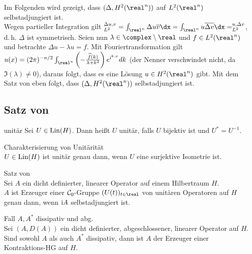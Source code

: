 \linie

\begin{Bsp}
    Im Folgenden wird gezeigt, dass $(\Delta, H^2(\real^n))$ auf $L^2(\real^n)$
    selbstadjungiert ist.\\
    Wegen partieller Integration gilt
    $\sp{\Delta u, v}_{L^2} = \int_{\real^n} \Delta u \overline{v} \dx
    = \int_{\real^n} u \overline{\Delta v} \dx = \sp{u, \Delta v}_{L^2}$,
    d.\,h. $\Delta$ ist symmetrisch.
    Seien nun $\lambda \in \complex \setminus \real$ und $f \in L^2(\real^n)$ und
    betrachte $\Delta u - \lambda u = f$.
    Mit Fouriertransformation gilt
    $u(x) = (2\pi)^{-n/2} \int_{\real^n}
    \left(-\frac{\widehat{f}(k)}{\lambda + k^2}\right) e^{\iu\sp{k, x}} dk$
    (der Nenner verschwindet nicht, da $\Im(\lambda) \not= 0$),
    daraus folgt, dass es eine Lösung $u \in H^2(\real^n)$ gibt.
    Mit dem Satz von eben folgt, dass $(\Delta, H^2(\real^n))$ selbstadjungiert ist.
\end{Bsp}

\pagebreak

\subsection{%
    Satz von %
}

\begin{Def}{unitär}
    Sei $U \in \operatorname{Lin}(H)$.
    Dann heißt $U$ unitär, falls $U$ bijektiv ist und $U^\ast = U^{-1}$.
\end{Def}

\begin{Lemma}{Charakterisierung von Unitärität}\\
    $U \in \operatorname{Lin}(H)$ ist unitär genau dann,
    wenn $U$ eine surjektive Isometrie ist.
\end{Lemma}

\begin{Satz}{Satz von }\\
    Sei $A$ ein dicht definierter, linearer Operator auf einem Hilbertraum $H$.\\
    $A$ ist Erzeuger einer $\mathcal{C}_0$-Gruppe $(U(t))_{t \in \real}$ von unitären Operatoren
    auf $H$ genau dann, wenn $\mathrm{i} A$ selbstadjungiert ist.
\end{Satz}

\begin{Lemma}{Fall $A, A^\ast$ dissipativ und abg.}\\
    Sei $(A, D(A))$ ein dicht definierter, abgeschlossener, linearer Operator auf $H$.\\
    Sind sowohl $A$ als auch $A^\ast$ dissipativ, dann ist $A$ der Erzeuger einer
    Kontraktions-HG auf $H$.
\end{Lemma}

